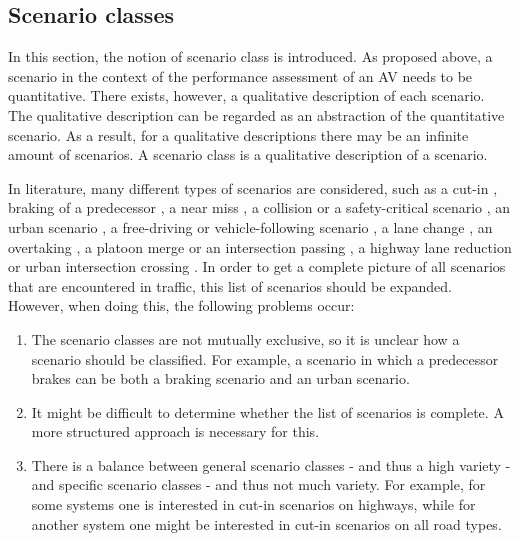 \subsection{Scenario classes}
\label{sec:scenario classes}
In this section, the notion of scenario class is introduced. As proposed above, a scenario in the context of the performance assessment of an AV needs to be quantitative. There exists, however, a qualitative description of each scenario. The qualitative description can be regarded as an abstraction of the quantitative scenario. As a result, for a qualitative descriptions there may be an infinite amount of scenarios. A scenario class is a qualitative description of a scenario. 

In literature, many different types of scenarios are considered, such as a cut-in \cite{xu2002effects, gietelink2006development,roesener2017comprehensive}, braking of a predecessor \cite{xu2002effects,deGelder2017assessment,hulshof2013autonomous}, a near miss \cite{gietelink2006development}, a collision or a safety-critical scenario \cite{gietelink2006development,ebner2011identifying}, an urban scenario \cite{zofka2015datadrivetrafficscenarios}, a free-driving or vehicle-following scenario \cite{roesener2017comprehensive}, a lane change \cite{roesener2017comprehensive}, an overtaking \cite{karaduman2013interactivebehavior}, a platoon merge or an intersection passing \cite{englund2016grand}, a highway lane reduction or urban intersection crossing \cite{ploeg2017GCDC}. In order to get a complete picture of all scenarios that are encountered in traffic, this list of scenarios should be expanded. However, when doing this, the following problems occur:

\begin{enumerate}
	\item The scenario classes are not mutually exclusive, so it is unclear how a scenario should be classified. For example, a scenario in which a predecessor brakes can be both a braking scenario and an urban scenario. \label{item:mutual exclusiveness}
	\item It might be difficult to determine whether the list of scenarios is complete. A more structured approach is necessary for this. \label{item:completeness}
	\item There is a balance between general scenario classes - and thus a high variety - and specific scenario classes - and thus not much variety. For example, for some systems one is interested in cut-in scenarios on highways, while for another system one might be interested in cut-in scenarios on all road types. \label{item:generality}
\end{enumerate}

